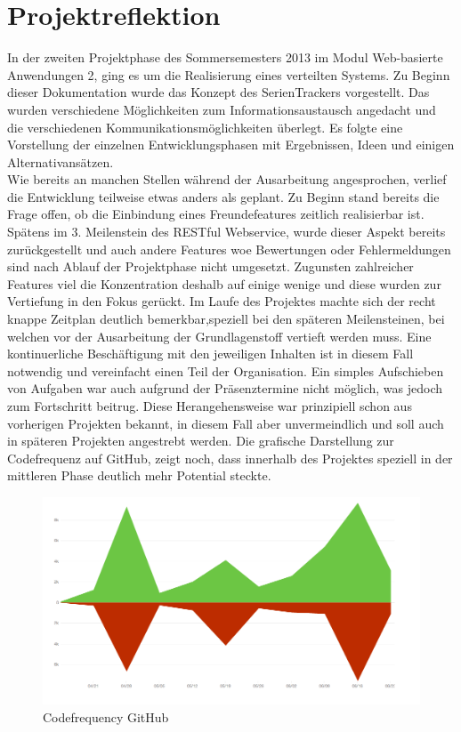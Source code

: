 \chapter{Projektreflektion}
In der zweiten Projektphase des Sommersemesters 2013 im Modul Web-basierte Anwendungen 2, ging es um die Realisierung eines verteilten Systems. Zu Beginn dieser Dokumentation wurde das Konzept des SerienTrackers vorgestellt. Das wurden verschiedene Möglichkeiten zum Informationsaustausch angedacht und die verschiedenen Kommunikationsmöglichkeiten überlegt. Es folgte eine Vorstellung der einzelnen Entwicklungsphasen mit Ergebnissen, Ideen und einigen Alternativansätzen.\\


Wie bereits an manchen Stellen während der Ausarbeitung angesprochen, verlief die Entwicklung teilweise etwas anders als geplant. Zu Beginn stand bereits die Frage offen, ob die Einbindung eines Freundefeatures zeitlich realisierbar ist. Spätens im 3. Meilenstein des RESTful Webservice, wurde dieser Aspekt bereits zurückgestellt und auch andere Features woe Bewertungen oder Fehlermeldungen sind nach Ablauf der Projektphase nicht umgesetzt.
Zugunsten zahlreicher Features viel die Konzentration deshalb auf einige wenige und diese wurden zur Vertiefung in den Fokus gerückt.
Im Laufe des Projektes machte sich der recht knappe Zeitplan deutlich bemerkbar,speziell bei den späteren Meilensteinen, bei welchen vor der Ausarbeitung der Grundlagenstoff vertieft werden muss. Eine kontinuerliche Beschäftigung mit den jeweiligen Inhalten ist in diesem Fall notwendig und vereinfacht einen Teil der Organisation. Ein simples Aufschieben von Aufgaben war auch aufgrund der Präsenztermine nicht möglich, was jedoch zum Fortschritt beitrug. Diese Herangehensweise war prinzipiell schon aus vorherigen Projekten bekannt, in diesem Fall aber unvermeindlich und soll auch in späteren Projekten angestrebt werden.
Die grafische Darstellung zur Codefrequenz auf GitHub, zeigt noch, dass innerhalb des Projektes speziell in der mittleren Phase deutlich mehr Potential steckte. 

\begin{figure}[H]
\includegraphics[width=1\textwidth]{../images/statistik}
\caption{Codefrequency GitHub }
\label{codefrequency}
\end{figure}

